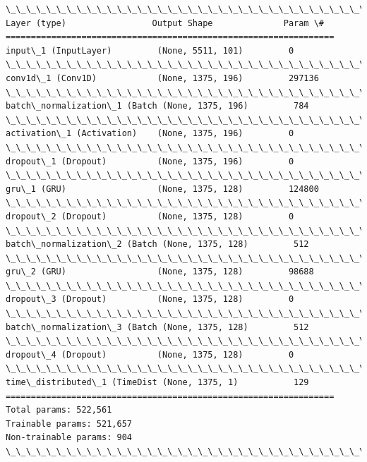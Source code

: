 \documentclass[11pt]{article}
\begin{document}
    \begin{Verbatim}[commandchars=\\\{\}]
\_\_\_\_\_\_\_\_\_\_\_\_\_\_\_\_\_\_\_\_\_\_\_\_\_\_\_\_\_\_\_\_\_\_\_\_\_\_\_\_\_\_\_\_\_\_\_\_\_\_\_\_\_\_\_\_\_\_\_\_\_\_\_\_\_
Layer (type)                 Output Shape              Param \#
=================================================================
input\_1 (InputLayer)         (None, 5511, 101)         0
\_\_\_\_\_\_\_\_\_\_\_\_\_\_\_\_\_\_\_\_\_\_\_\_\_\_\_\_\_\_\_\_\_\_\_\_\_\_\_\_\_\_\_\_\_\_\_\_\_\_\_\_\_\_\_\_\_\_\_\_\_\_\_\_\_
conv1d\_1 (Conv1D)            (None, 1375, 196)         297136
\_\_\_\_\_\_\_\_\_\_\_\_\_\_\_\_\_\_\_\_\_\_\_\_\_\_\_\_\_\_\_\_\_\_\_\_\_\_\_\_\_\_\_\_\_\_\_\_\_\_\_\_\_\_\_\_\_\_\_\_\_\_\_\_\_
batch\_normalization\_1 (Batch (None, 1375, 196)         784
\_\_\_\_\_\_\_\_\_\_\_\_\_\_\_\_\_\_\_\_\_\_\_\_\_\_\_\_\_\_\_\_\_\_\_\_\_\_\_\_\_\_\_\_\_\_\_\_\_\_\_\_\_\_\_\_\_\_\_\_\_\_\_\_\_
activation\_1 (Activation)    (None, 1375, 196)         0
\_\_\_\_\_\_\_\_\_\_\_\_\_\_\_\_\_\_\_\_\_\_\_\_\_\_\_\_\_\_\_\_\_\_\_\_\_\_\_\_\_\_\_\_\_\_\_\_\_\_\_\_\_\_\_\_\_\_\_\_\_\_\_\_\_
dropout\_1 (Dropout)          (None, 1375, 196)         0
\_\_\_\_\_\_\_\_\_\_\_\_\_\_\_\_\_\_\_\_\_\_\_\_\_\_\_\_\_\_\_\_\_\_\_\_\_\_\_\_\_\_\_\_\_\_\_\_\_\_\_\_\_\_\_\_\_\_\_\_\_\_\_\_\_
gru\_1 (GRU)                  (None, 1375, 128)         124800
\_\_\_\_\_\_\_\_\_\_\_\_\_\_\_\_\_\_\_\_\_\_\_\_\_\_\_\_\_\_\_\_\_\_\_\_\_\_\_\_\_\_\_\_\_\_\_\_\_\_\_\_\_\_\_\_\_\_\_\_\_\_\_\_\_
dropout\_2 (Dropout)          (None, 1375, 128)         0
\_\_\_\_\_\_\_\_\_\_\_\_\_\_\_\_\_\_\_\_\_\_\_\_\_\_\_\_\_\_\_\_\_\_\_\_\_\_\_\_\_\_\_\_\_\_\_\_\_\_\_\_\_\_\_\_\_\_\_\_\_\_\_\_\_
batch\_normalization\_2 (Batch (None, 1375, 128)         512
\_\_\_\_\_\_\_\_\_\_\_\_\_\_\_\_\_\_\_\_\_\_\_\_\_\_\_\_\_\_\_\_\_\_\_\_\_\_\_\_\_\_\_\_\_\_\_\_\_\_\_\_\_\_\_\_\_\_\_\_\_\_\_\_\_
gru\_2 (GRU)                  (None, 1375, 128)         98688
\_\_\_\_\_\_\_\_\_\_\_\_\_\_\_\_\_\_\_\_\_\_\_\_\_\_\_\_\_\_\_\_\_\_\_\_\_\_\_\_\_\_\_\_\_\_\_\_\_\_\_\_\_\_\_\_\_\_\_\_\_\_\_\_\_
dropout\_3 (Dropout)          (None, 1375, 128)         0
\_\_\_\_\_\_\_\_\_\_\_\_\_\_\_\_\_\_\_\_\_\_\_\_\_\_\_\_\_\_\_\_\_\_\_\_\_\_\_\_\_\_\_\_\_\_\_\_\_\_\_\_\_\_\_\_\_\_\_\_\_\_\_\_\_
batch\_normalization\_3 (Batch (None, 1375, 128)         512
\_\_\_\_\_\_\_\_\_\_\_\_\_\_\_\_\_\_\_\_\_\_\_\_\_\_\_\_\_\_\_\_\_\_\_\_\_\_\_\_\_\_\_\_\_\_\_\_\_\_\_\_\_\_\_\_\_\_\_\_\_\_\_\_\_
dropout\_4 (Dropout)          (None, 1375, 128)         0
\_\_\_\_\_\_\_\_\_\_\_\_\_\_\_\_\_\_\_\_\_\_\_\_\_\_\_\_\_\_\_\_\_\_\_\_\_\_\_\_\_\_\_\_\_\_\_\_\_\_\_\_\_\_\_\_\_\_\_\_\_\_\_\_\_
time\_distributed\_1 (TimeDist (None, 1375, 1)           129
=================================================================
Total params: 522,561
Trainable params: 521,657
Non-trainable params: 904
\_\_\_\_\_\_\_\_\_\_\_\_\_\_\_\_\_\_\_\_\_\_\_\_\_\_\_\_\_\_\_\_\_\_\_\_\_\_\_\_\_\_\_\_\_\_\_\_\_\_\_\_\_\_\_\_\_\_\_\_\_\_\_\_\_
    \end{Verbatim}
\end{document}
